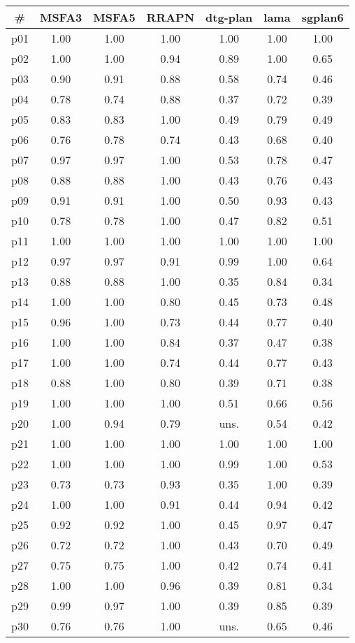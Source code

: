 \begin{tabular}{ccccccc}
\toprule
\textbf{\#} & \textbf{MSFA3} & \textbf{MSFA5} & \textbf{RRAPN} & \textbf{dtg-plan} & \textbf{lama} & \textbf{sgplan6}\\
\midrule
p01 & 1.00 & 1.00 & 1.00 & 1.00 & 1.00 & 1.00\\
p02 & 1.00 & 1.00 & 0.94 & 0.89 & 1.00 & 0.65\\
p03 & 0.90 & 0.91 & 0.88 & 0.58 & 0.74 & 0.46\\
p04 & 0.78 & 0.74 & 0.88 & 0.37 & 0.72 & 0.39\\
p05 & 0.83 & 0.83 & 1.00 & 0.49 & 0.79 & 0.49\\
p06 & 0.76 & 0.78 & 0.74 & 0.43 & 0.68 & 0.40\\
p07 & 0.97 & 0.97 & 1.00 & 0.53 & 0.78 & 0.47\\
p08 & 0.88 & 0.88 & 1.00 & 0.43 & 0.76 & 0.43\\
p09 & 0.91 & 0.91 & 1.00 & 0.50 & 0.93 & 0.43\\
p10 & 0.78 & 0.78 & 1.00 & 0.47 & 0.82 & 0.51\\
p11 & 1.00 & 1.00 & 1.00 & 1.00 & 1.00 & 1.00\\
p12 & 0.97 & 0.97 & 0.91 & 0.99 & 1.00 & 0.64\\
p13 & 0.88 & 0.88 & 1.00 & 0.35 & 0.84 & 0.34\\
p14 & 1.00 & 1.00 & 0.80 & 0.45 & 0.73 & 0.48\\
p15 & 0.96 & 1.00 & 0.73 & 0.44 & 0.77 & 0.40\\
p16 & 1.00 & 1.00 & 0.84 & 0.37 & 0.47 & 0.38\\
p17 & 1.00 & 1.00 & 0.74 & 0.44 & 0.77 & 0.43\\
p18 & 0.88 & 1.00 & 0.80 & 0.39 & 0.71 & 0.38\\
p19 & 1.00 & 1.00 & 1.00 & 0.51 & 0.66 & 0.56\\
p20 & 1.00 & 0.94 & 0.79 & uns. & 0.54 & 0.42\\
p21 & 1.00 & 1.00 & 1.00 & 1.00 & 1.00 & 1.00\\
p22 & 1.00 & 1.00 & 1.00 & 0.99 & 1.00 & 0.53\\
p23 & 0.73 & 0.73 & 0.93 & 0.35 & 1.00 & 0.39\\
p24 & 1.00 & 1.00 & 0.91 & 0.44 & 0.94 & 0.42\\
p25 & 0.92 & 0.92 & 1.00 & 0.45 & 0.97 & 0.47\\
p26 & 0.72 & 0.72 & 1.00 & 0.43 & 0.70 & 0.49\\
p27 & 0.75 & 0.75 & 1.00 & 0.42 & 0.74 & 0.41\\
p28 & 1.00 & 1.00 & 0.96 & 0.39 & 0.81 & 0.34\\
p29 & 0.99 & 0.97 & 1.00 & 0.39 & 0.85 & 0.39\\
p30 & 0.76 & 0.76 & 1.00 & uns. & 0.65 & 0.46\\
\bottomrule
\end{tabular}

